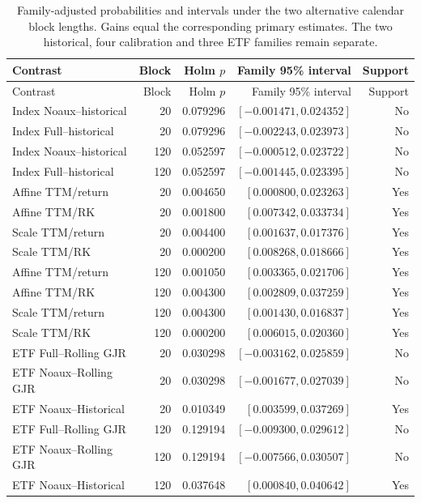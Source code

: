 \begingroup
\small
\setlength{\tabcolsep}{4pt}
\begin{longtable}{@{}>{\raggedright\arraybackslash}p{4.5cm}rrrr@{}}
\caption[Follow-up block sensitivities]{Family-adjusted probabilities and intervals under the two alternative calendar block lengths. Gains equal the corresponding primary estimates. The two historical, four calibration and three ETF families remain separate.}\label{tab:followup-sensitivity}\\
\toprule Contrast & Block & Holm $p$ & Family 95\% interval & Support \\
\midrule\endfirsthead
\toprule Contrast & Block & Holm $p$ & Family 95\% interval & Support \\
\midrule\endhead
Index Noaux--historical & 20 & 0.079296 & $[-0.001471,0.024352]$ & No \\
Index Full--historical & 20 & 0.079296 & $[-0.002243,0.023973]$ & No \\
Index Noaux--historical & 120 & 0.052597 & $[-0.000512,0.023722]$ & No \\
Index Full--historical & 120 & 0.052597 & $[-0.001445,0.023395]$ & No \\
Affine TTM/return & 20 & 0.004650 & $[0.000800,0.023263]$ & Yes \\
Affine TTM/RK & 20 & 0.001800 & $[0.007342,0.033734]$ & Yes \\
Scale TTM/return & 20 & 0.004400 & $[0.001637,0.017376]$ & Yes \\
Scale TTM/RK & 20 & 0.000200 & $[0.008268,0.018666]$ & Yes \\
Affine TTM/return & 120 & 0.001050 & $[0.003365,0.021706]$ & Yes \\
Affine TTM/RK & 120 & 0.004300 & $[0.002809,0.037259]$ & Yes \\
Scale TTM/return & 120 & 0.004300 & $[0.001430,0.016837]$ & Yes \\
Scale TTM/RK & 120 & 0.000200 & $[0.006015,0.020360]$ & Yes \\
ETF Full--Rolling GJR & 20 & 0.030298 & $[-0.003162,0.025859]$ & No \\
ETF Noaux--Rolling GJR & 20 & 0.030298 & $[-0.001677,0.027039]$ & No \\
ETF Noaux--Historical & 20 & 0.010349 & $[0.003599,0.037269]$ & Yes \\
ETF Full--Rolling GJR & 120 & 0.129194 & $[-0.009300,0.029612]$ & No \\
ETF Noaux--Rolling GJR & 120 & 0.129194 & $[-0.007566,0.030507]$ & No \\
ETF Noaux--Historical & 120 & 0.037648 & $[0.000840,0.040642]$ & Yes \\
\bottomrule\end{longtable}
\endgroup

